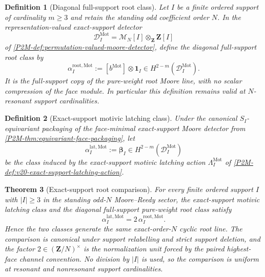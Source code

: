 \documentclass[11pt]{article}
\newtheorem{theorem}{Theorem}[section]
\newtheorem{definition}[theorem]{Definition}
\theoremstyle{remark}
\newcommand{\Mot}{\mathrm{Mot}}
\begin{document}
\begin{definition}[Diagonal full-support root class]\label{def:diagonal-full-support-root-class}
Let $I$ be a finite ordered support of cardinality $m\ge3$ and retain the standing odd
coefficient order $N$.  In the representation-valued exact-support detector
\[
 \mathcal D_I^{\Mot}=\mathcal M_N[I]\otimes_{\mathbf Z}\mathbf Z[I]
\]
of \cref{P2M-def:permutation-valued-moore-detector}, define the \emph{diagonal
full-support root class} by
\begin{equation}\label{eq:diagonal-full-support-root-class}
 \boxed{
 \alpha_{I}^{\mathrm{root},\Mot}
 :=[b^{\Mot}]\otimes\mathbf1_I
 \in H^{2-m}(\mathcal D_I^{\Mot}).}
\end{equation}
It is the full-support copy of the pure-weight root Moore line, with no scalar
compression of the face module.  In particular this definition remains valid at
$N$-resonant support cardinalities.
\end{definition}

\begin{definition}[Exact-support motivic latching class]\label{def:exact-support-motivic-latching-class}
Under the canonical $S_I$-equivariant packaging of the face-minimal exact-support
Moore detector from \cref{P2M-thm:equivariant-face-packaging}, let
\begin{equation}\label{eq:exact-support-motivic-latching-class}
 \boxed{
 \alpha_I^{\mathrm{lat},\Mot}:=\boldsymbol\beta_I
 \in H^{2-m}(\mathcal D_I^{\Mot})}
\end{equation}
be the class induced by the exact-support motivic latching action
$\Lambda_I^{\Mot}$ of \cref{P2M-def:v20-exact-support-latching-action}.
\end{definition}

\begin{theorem}[Exact-support root comparison]\label{thm:exact-support-root-comparison}
For every finite ordered support $I$ with $|I|\ge3$ in the standing odd-$N$ Moore--Reedy
sector, the exact-support motivic latching class and the diagonal full-support
pure-weight root class satisfy
\begin{equation}\label{eq:exact-support-root-comparison}
 \boxed{
 \alpha_I^{\mathrm{lat},\Mot}
 =2\,\alpha_I^{\mathrm{root},\Mot}.}
\end{equation}
Hence the two classes generate the same exact-order-$N$ cyclic root line.  The
comparison is canonical under support relabelling and strict support deletion, and the
factor $2\in(\mathbf Z/N)^\times$ is the normalization unit forced by the paired
highest-face channel convention.  No division by $|I|$ is used, so the comparison is
uniform at resonant and nonresonant support cardinalities.
\end{theorem}
\end{document}
